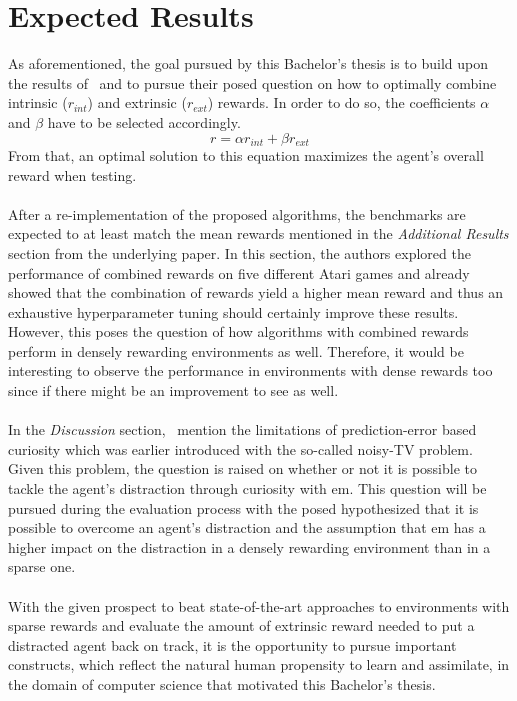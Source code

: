 \documentclass[draft,final]{vutinfth} %
\begin{document}
    \section{Expected Results}\label{sec:expected-results}
    As aforementioned, the goal pursued by this Bachelor's thesis is to build upon the results of~\citeauthor{burda_large-scale_2018-1} and to pursue their posed question on how to optimally combine intrinsic ($r_{int}$) and extrinsic ($r_{ext}$) rewards.
    In order to do so, the coefficients $\alpha$ and $\beta$ have to be selected accordingly.
    \[r=\alpha r_{int} + \beta r_{ext}\]
    From that, an optimal solution to this equation maximizes the agent's overall reward when testing.
    \\\\
    After a re-implementation of the proposed algorithms, the benchmarks are expected to at least match the mean rewards mentioned in the \textit{Additional Results} section from the underlying paper.
    In this section, the authors explored the performance of combined rewards on five different Atari games and already showed that the combination of rewards yield a higher mean reward and thus an exhaustive hyperparameter tuning should certainly improve these results.
    However, this poses the question of how algorithms with combined rewards perform in densely rewarding environments as well.
    Therefore, it would be interesting to observe the performance in environments with dense rewards too since if there might be an improvement to see as well.
    \\\\
    In the \textit{Discussion} section,~\citeauthor{burda_large-scale_2018-1} mention the limitations of prediction-error based curiosity which was earlier introduced with the so-called noisy-TV problem.
    Given this problem, the question is raised on whether or not it is possible to tackle the agent's distraction through curiosity with \gls{em}.
    This question will be pursued during the evaluation process with the posed hypothesized that it is possible to overcome an agent's distraction and the assumption that \gls{em} has a higher impact on the distraction in a densely rewarding environment than in a sparse one.
    \\\\
    With the given prospect to beat state-of-the-art approaches to environments with sparse rewards and evaluate the amount of extrinsic reward needed to put a distracted agent back on track, it is the opportunity to pursue important constructs, which reflect the natural human propensity to learn and assimilate, in the domain of computer science that motivated this Bachelor's thesis.
\end{document}
